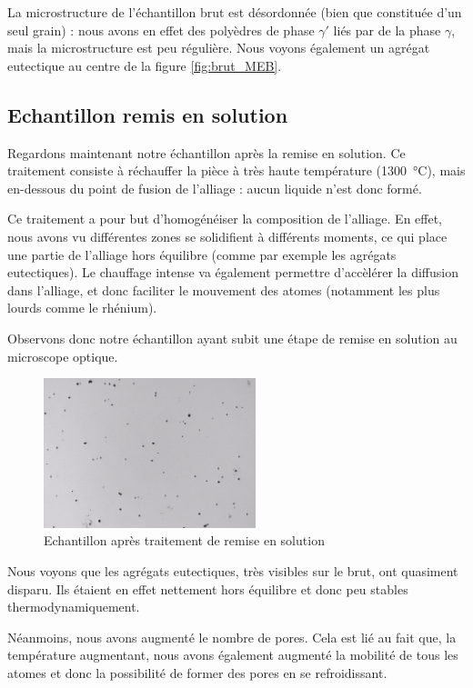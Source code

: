 La microstructure de l'échantillon brut est désordonnée (bien que constituée d'un seul grain) :
nous avons en effet des polyèdres de phase $\gamma'$ liés par de la phase $\gamma$,
mais la microstructure est peu régulière. Nous voyons également un agrégat eutectique 
au centre de la figure \ref{fig:brut_MEB}.


\subsection*{Echantillon remis en solution}

Regardons maintenant notre échantillon après la remise en solution. 
Ce traitement consiste à réchauffer la pièce à très haute température (\SI{1300}{\celsius}),
mais en-dessous du point de fusion de l'alliage : aucun liquide n'est donc formé. 

Ce traitement a pour but d'homogénéiser la composition de l'alliage. En effet, nous avons 
vu différentes zones se solidifient à différents moments, ce qui place une partie de l'alliage
hors équilibre (comme par exemple les agrégats eutectiques). Le chauffage intense va également 
permettre d'accèlérer la diffusion dans l'alliage, et donc faciliter le mouvement des atomes 
(notamment les plus lourds comme le rhénium). 

Observons donc notre échantillon ayant subit une étape de remise en solution au microscope optique.

\begin{figure}[H]
    \centering
    \includegraphics[width=0.55\textwidth]{images_optique/res.pdf}
    \caption{Echantillon après traitement de remise en solution}
    \label{fig:RES_optique}
\end{figure}

Nous voyons que les agrégats eutectiques, très visibles sur le brut, ont quasiment disparu.
Ils étaient en effet nettement hors équilibre et donc peu stables thermodynamiquement. 

Néanmoins, nous avons augmenté le nombre de pores. Cela est lié au fait que, la température 
augmentant, nous avons également augmenté la mobilité de tous les atomes et donc la possibilité
de former des pores en se refroidissant.\\


